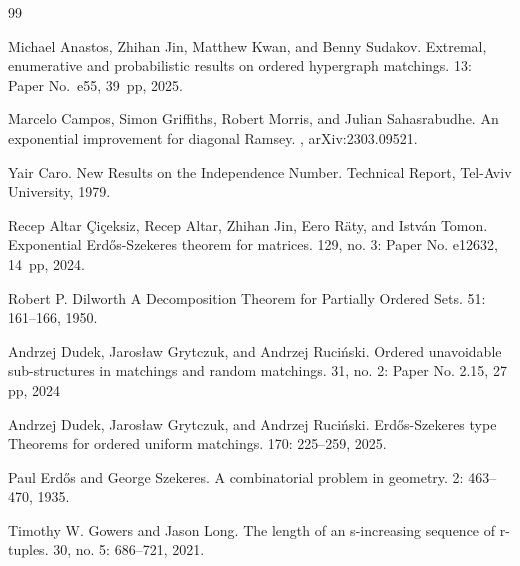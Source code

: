 \documentclass{aic}
\theoremstyle{definition}
\numberwithin{equation}{section}
\numberwithin{figure}{section}
\begin{document}

\begin{thebibliography}{99}



Michael Anastos, Zhihan Jin, Matthew Kwan, and Benny Sudakov.
\newblock Extremal, enumerative and probabilistic results on ordered hypergraph matchings.
 13: Paper No.~e55, 39~pp, 2025.

Marcelo Campos, Simon Griffiths, Robert Morris, and Julian Sahasrabudhe. 
\newblock An exponential improvement for diagonal Ramsey.
, arXiv:2303.09521.

Yair Caro. 
\newblock New Results on the Independence Number.
\newblock Technical Report, Tel-Aviv University, 1979.

Recep Altar Çiçeksiz, Recep Altar, Zhihan Jin, Eero Räty, and István Tomon. 
\newblock Exponential Erd\H{o}s-Szekeres theorem for matrices.
 129, no. 3: Paper No. e12632, 14~pp, 2024.

Robert P. Dilworth 
\newblock A Decomposition Theorem for Partially Ordered Sets.
  51: 161--166, 1950.

Andrzej Dudek, Jarosław Grytczuk, and Andrzej Ruci\'{n}ski. 
\newblock Ordered unavoidable sub-structures in matchings and random matchings.
 31, no. 2: Paper No. 2.15, 27 pp, 2024

Andrzej Dudek, Jarosław Grytczuk, and Andrzej Ruci\'{n}ski. 
\newblock Erd\H{o}s-Szekeres type Theorems for ordered uniform matchings.
 170: 225--259, 2025.

Paul Erd{\H o}s and George Szekeres. 
\newblock A combinatorial problem in geometry.
 2: 463--470, 1935.

 Timothy W. Gowers and Jason Long.
\newblock The length of an s-increasing sequence of r-tuples.  30, no. 5: 686--721, 2021.


\end{thebibliography}
\end{document}
